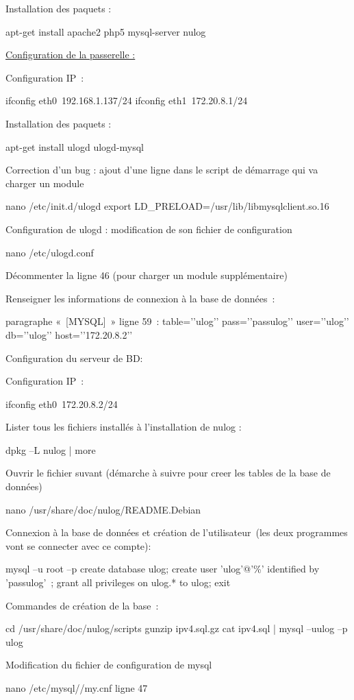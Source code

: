 \documentclass[12pt]{report}
\begin{document}
\begin{itemize}
Installation des paquets :

apt-get install apache2 php5 mysql-server nulog

\underline{Configuration de la passerelle :}

Configuration IP :

ifconfig eth0 192.168.1.137/24
ifconfig eth1 172.20.8.1/24

Installation des paquets :

apt-get install ulogd ulogd-mysql

Correction d'un bug : ajout d’une ligne dans le script de démarrage qui va charger un module

nano /etc/init.d/ulogd
export LD_PRELOAD=/usr/lib/libmysqlclient.so.16

Configuration de ulogd : modification de son fichier de configuration

nano /etc/ulogd.conf

Décommenter la ligne 46 (pour charger un module supplémentaire)

Renseigner les informations de connexion à la base de données :

paragraphe « [MYSQL] » ligne 59 :
table=’’ulog’’
pass=’’passulog’’
user=’’ulog’’
db=’’ulog’’
host=’’172.20.8.2’’

Configuration du serveur de BD:

Configuration IP :

ifconfig eth0 172.20.8.2/24

Lister tous les fichiers installés à l’installation de nulog :

dpkg –L nulog | more

Ouvrir le fichier suvant (démarche à suivre pour creer les tables de la base de données)

nano /usr/share/doc/nulog/README.Debian

Connexion à la base de données et création de l’utilisateur (les deux programmes vont se connecter avec ce compte):

mysql –u root –p
create database ulog;
create user 'ulog'@'\%' identified by 'passulog' ;
grant all privileges on ulog.* to ulog;
exit

Commandes de création de la base :

cd /usr/share/doc/nulog/scripts
gunzip ipv4.sql.gz
cat ipv4.sql | mysql –uulog –p ulog

Modification du fichier de configuration de mysql

nano /etc/mysql//my.cnf
ligne 47


\end{itemize}
\end{document}
